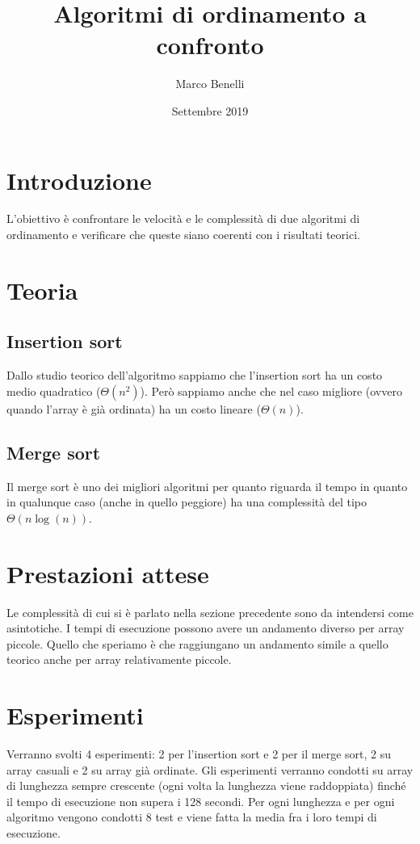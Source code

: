 \documentclass{article}
\title{Algoritmi di ordinamento a confronto}
\author{Marco Benelli}
\date{Settembre 2019}
\begin{document}
\maketitle

\section{Introduzione}

L'obiettivo è confrontare le velocità e le complessità di due algoritmi di ordinamento e verificare che queste siano coerenti con i risultati teorici.

\section{Teoria}

\subsection{Insertion sort}

Dallo studio teorico dell'algoritmo sappiamo che l'insertion sort ha un costo medio quadratico ($\Theta(n^2)$). Però sappiamo anche che nel caso migliore (ovvero quando l'array è già ordinata) ha un costo lineare ($\Theta(n)$).

\subsection{Merge sort}

Il merge sort è uno dei migliori algoritmi per quanto riguarda il tempo in quanto in qualunque caso (anche in quello peggiore) ha una complessità del tipo $\Theta(n \log(n))$.

\section{Prestazioni attese}

Le complessità di cui si è parlato nella sezione precedente sono da intendersi come asintotiche. I tempi di esecuzione possono avere un andamento diverso per array piccole. Quello che speriamo è che raggiungano un andamento simile a quello teorico anche per array relativamente piccole.

\section{Esperimenti}

Verranno svolti 4 esperimenti: 2 per l'insertion sort e 2 per il merge sort, 2 su array casuali e 2 su array già ordinate. Gli esperimenti verranno condotti su array di lunghezza sempre crescente (ogni volta la lunghezza viene raddoppiata) finché il tempo di esecuzione non supera i 128 secondi. Per ogni lunghezza e per ogni algoritmo vengono condotti 8 test e viene fatta la media fra i loro tempi di esecuzione.
\end{document}
